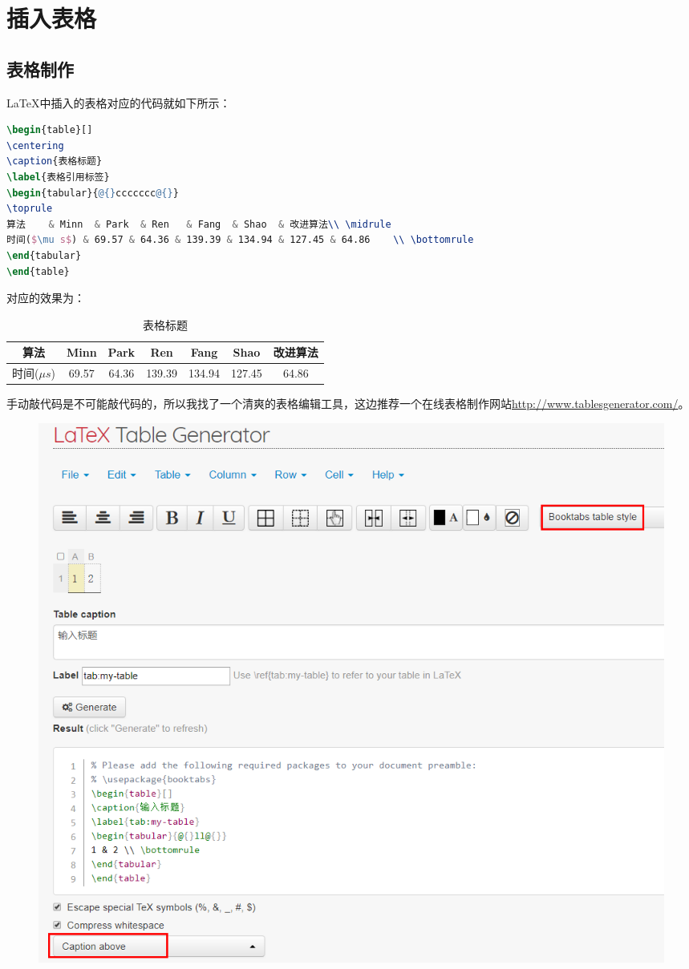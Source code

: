 \section{插入表格}
\subsection{表格制作}
LaTeX中插入的表格对应的代码就如下所示：
\begin{lstlisting}[language={tex}, caption={}]
\begin{table}[]
\centering
\caption{表格标题}
\label{表格引用标签}
\begin{tabular}{@{}ccccccc@{}}
\toprule
算法    & Minn  & Park  & Ren   & Fang  & Shao  & 改进算法\\ \midrule
时间($\mu s$) & 69.57 & 64.36 & 139.39 & 134.94 & 127.45 & 64.86    \\ \bottomrule
\end{tabular}
\end{table}
\end{lstlisting}
对应的效果为：
\begin{table}[h]
\centering
\caption{表格标题}
\label{表格引用标签}
\begin{tabular}{@{}ccccccc@{}}
\toprule
算法    & Minn  & Park  & Ren   & Fang  & Shao  & 改进算法\\ \midrule
时间($\mu s$) & 69.57 & 64.36 & 139.39 & 134.94 & 127.45 & 64.86    \\ \bottomrule
\end{tabular}
\end{table}

手动敲代码是不可能敲代码的，所以我找了一个清爽的表格编辑工具，这边推荐一个在线表格制作网站\url{http://www.tablesgenerator.com/}。
\begin{figure}[h]
 \centering
 \includegraphics[width=1\textwidth]{HelperSection/figures/tableGenerator1.png}
 \caption{}
 \label{}
\end{figure}

